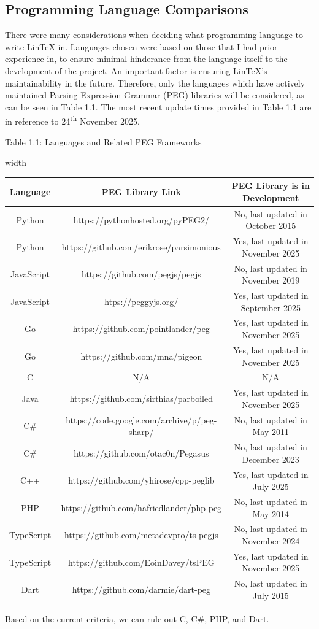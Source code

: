 \documentclass[11pt,titlepage,dvipsnames,table,xcdraw]{article}
\begin{document}

\subsection{Programming Language Comparisons}
There were many considerations when deciding what programming language to write LinTeX in. Languages chosen were based on those that I had prior experience in, to ensure minimal hinderance from the language itself to the development of the project. An important factor is ensuring LinTeX's maintainability in the future. Therefore, only the languages which have actively maintained Parsing Expression Grammar (PEG) libraries will be considered, as can be seen in Table 1.1. The most recent update times provided in Table 1.1 are in reference to 24\textsuperscript{th} November 2025.
\begin{center}
Table 1.1: Languages and Related PEG Frameworks
\begin{adjustbox}{width=\textwidth}
\begin{tabular}{ c | c | c}
Language & PEG Library Link & PEG Library is in Development \\
\hline
Python & https://pythonhosted.org/pyPEG2/ & No, last updated in October 2015 \\
Python & https://github.com/erikrose/parsimonious & Yes, last updated in November 2025 \\
JavaScript & https://github.com/pegjs/pegjs & No, last updated in November 2019 \\
JavaScript & htps://peggyjs.org/ & Yes, last updated in September 2025 \\
Go & https://github.com/pointlander/peg & Yes, last updated in November 2025 \\
Go & https://github.com/mna/pigeon & Yes, last updated in November 2025 \\
C & N/A & N/A \\
Java & https://github.com/sirthias/parboiled & Yes, last updated in November 2025 \\
C\# & https://code.google.com/archive/p/peg-sharp/ & No, last updated in May 2011 \\
C\# & https://github.com/otac0n/Pegasus & No, last updated in December 2023 \\ 
C++ & https://github.com/yhirose/cpp-peglib & Yes, last updated in July 2025 \\
PHP & https://github.com/hafriedlander/php-peg & No, last updated in May 2014 \\
TypeScript & https://github.com/metadevpro/ts-pegjs & No, last updated in November 2024 \\
TypeScript & https://github.com/EoinDavey/tsPEG & Yes, last updated in November 2025 \\
Dart & https://github.com/darmie/dart-peg & No, last updated in July 2015 \\
\end{tabular}
\end{adjustbox}
\end{center}
Based on the current criteria, we can rule out C, C\#, PHP, and Dart.
\end{document}
